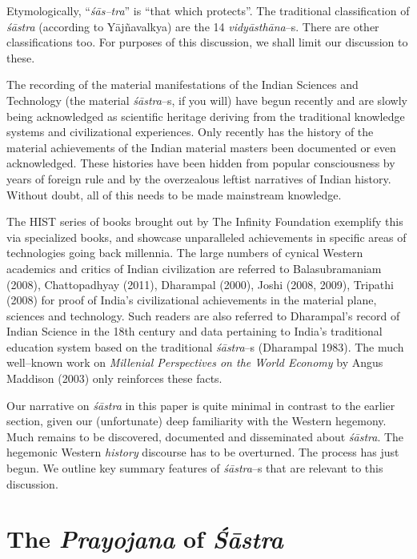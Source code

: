 Etymologically, “\textit{śās–tra}” is “that which protects”. The traditional classification of \textit{śāstra} (according to Yājñavalkya) are the 14 \textit{vidyāsthāna}–s. There are other classifications too. For purposes of this discussion, we shall limit our discussion to these.

The recording of the material manifestations of the Indian Sciences and Technology (the material \textit{śāstra}–s, if you will) have begun recently and are slowly being acknowledged as scientific heritage deriving from the traditional knowledge systems and civilizational experiences. Only recently has the history of the material achievements of the Indian material masters been documented or even acknowledged. These histories have been hidden from popular consciousness by years of foreign rule and by the overzealous leftist narratives of Indian history. Without doubt, all of this needs to be made mainstream knowledge.

The HIST series of books brought out by The Infinity Foundation exemplify this via specialized books, and showcase unparalleled achievements in specific areas of technologies going back millennia. The large numbers of cynical Western academics and critics of Indian civilization are referred to Balasubramaniam (2008), Chattopadhyay (2011), Dharampal (2000), Joshi (2008, 2009), Tripathi (2008) for proof of India’s civilizational achievements in the material plane, sciences and technology. Such readers are also referred to Dharampal’s record of Indian Science in the 18th century and data pertaining to India’s traditional education system based on the traditional \textit{śāstra}–s (Dharampal 1983). The much well–known work on \textit{Millenial Perspectives on the World Economy} by Angus Maddison (2003) only reinforces these facts.

Our narrative on \textit{śāstra} in this paper is quite minimal in contrast to the earlier section, given our (unfortunate) deep familiarity with the Western hegemony. Much remains to be discovered, documented and disseminated about \textit{śāstra}. The hegemonic Western \textit{history} discourse has to be overturned. The process has just begun. We outline key summary features of \textit{śāstra}–s that are relevant to this discussion.


\section*{The \textit{Prayojana} of \textit{Śāstra}}


